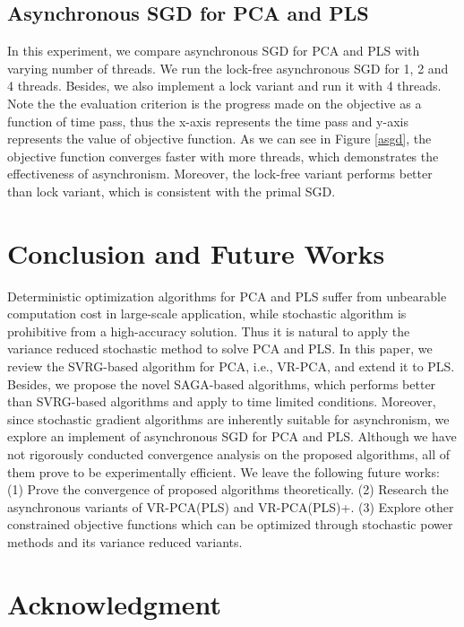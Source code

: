 \documentclass[conference]{IEEEtran}
\begin{document}
 \subsection{Asynchronous SGD for PCA and PLS}
In this experiment, we compare asynchronous SGD for PCA and PLS with varying number of threads. 
We run the lock-free asynchronous SGD for 1, 2 and 4 threads. Besides, we also implement a lock variant and run it with 4 threads. Note the the evaluation criterion is the progress made on the objective as a function of time pass, thus the x-axis represents the time pass and y-axis represents the value of objective function. As we can see in Figure \ref{asgd}, the objective function converges faster with more threads, which demonstrates the effectiveness of asynchronism. Moreover, the lock-free variant performs better than lock variant, which is consistent with the primal SGD.
 


\section{Conclusion and Future Works}
\label{discussion}
Deterministic optimization algorithms for PCA and PLS suffer from unbearable computation cost in large-scale application, while stochastic algorithm is prohibitive from a high-accuracy solution. Thus it is natural to apply the variance reduced stochastic method to solve PCA and PLS. In this paper, we review the SVRG-based algorithm for PCA, i.e., VR-PCA, and extend it to PLS. Besides, we propose the novel
SAGA-based algorithms, which performs better than SVRG-based algorithms and apply to time limited conditions. Moreover, since stochastic gradient algorithms are inherently suitable for asynchronism, we explore an implement of asynchronous SGD for PCA and PLS. 
Although we have not rigorously conducted convergence analysis on the proposed algorithms, all of them prove to be experimentally efficient.
We leave the following future works: (1) Prove the convergence of proposed algorithms theoretically. (2) Research the asynchronous variants of VR-PCA(PLS) and VR-PCA(PLS)+. (3) Explore other constrained objective functions which can be optimized through stochastic power methods and its variance reduced variants.



\section*{Acknowledgment}






%




\end{document}
